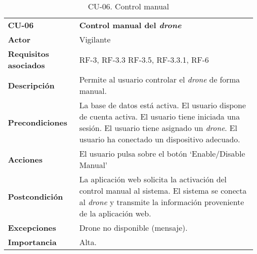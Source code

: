 \begin{table}[H]
	\begin{center}
		\begin{tabular}{m{3cm} | m{10cm}}\hline
			\toprule
			\textbf{CU-06} & \textbf{Control manual del \emph{drone}}\\
			\otoprule
			\textbf{Actor} & Vigilante\\
			\textbf{Requisitos asociados} & RF-3, RF-3.3 RF-3.5, RF-3.3.1, RF-6\\
			\textbf{Descripción} & Permite al usuario controlar el \emph{drone} de forma manual.\\
			\textbf{Precondiciones} & La base de datos está activa. El usuario dispone de cuenta activa. El usuario tiene iniciada una sesión. El usuario tiene asignado un \emph{drone}. El usuario ha conectado un dispositivo adecuado.\\
			\textbf{Acciones} & El usuario pulsa sobre el botón `Enable/Disable Manual'\\
											
			\textbf{Postcondición} & La aplicación web solicita la activación del control manual al sistema. El sistema se conecta al \emph{drone} y transmite la información proveniente de la aplicación web.\\
			\textbf{Excepciones} & Drone no disponible (mensaje).\\
			\textbf{Importancia} & Alta.\\
			\hline
			\bottomrule
		\end{tabular}
		\caption{CU-06. Control manual}
		\label{tb:CU06}
	\end{center}
\end{table}

